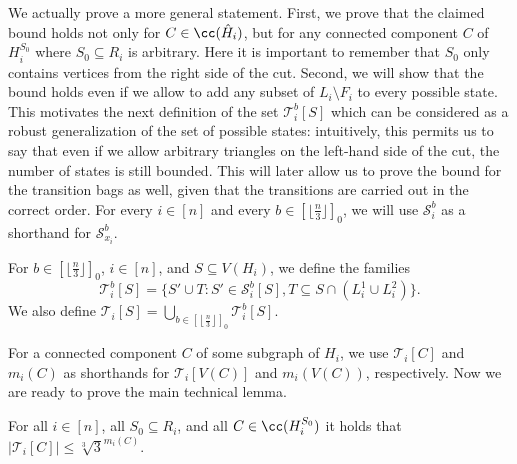 \documentclass[a4paper,UKenglish,cleveref, autoref, thm-restate]{lipics-v2021}
\begin{document}
We actually prove a more general statement. First, we prove that the claimed bound holds not only for $C\in\cc(\hat{H}_i)$, but for any connected component $C$ of $H_i^{S_0}$ where $S_0\subseteq R_i$ is arbitrary. 
Here it is important to remember that $S_0$ only contains vertices from the right side of the cut. 
Second, we will show that the bound holds even if we allow to add any subset of $L_i\setminus F_i$ to every possible state.
This motivates the next definition of the set $\mathcal{T}_i^b[S]$ which can be considered as a robust generalization of the set of possible states: intuitively, this permits us to say that even if we allow arbitrary triangles on the left-hand side of the cut, 
the number of states is still bounded.
This will later allow us to prove the bound for the transition bags as well, given that the transitions are carried out in the correct order.
For every $i \in [n]$ and every $b\in [\lfloor\frac{n}{3}\rfloor]_0$, we will use $\mathcal{S}_i^b$ as a shorthand for $\mathcal{S}_{x_i}^b$.

\begin{definition}
    For $b\in [\lfloor\frac{n}{3}\rfloor]_0$, $i\in[n]$, and $S\subseteq V(H_i)$, we define  the families 
    \[
    \mathcal{T}_i^b[S] = \{S'\cup T\colon S'\in\mathcal{S}_i^b[S], T \subseteq S\cap (L^1_i\cup L^2_i)\}.
    \]
    We also define 
    $\mathcal{T}_i[S] =\bigcup\limits_{b\in\left[\left\lfloor\frac{n}{3}\right\rfloor\right]_0} \mathcal{T}_i^b[S]$.
\end{definition}

For a connected component $C$ of some subgraph of $H_i$, we use $\mathcal{T}_i[C]$ and $m_i(C)$ as shorthands for $\mathcal{T}_i[V(C)]$ and $m_i(V(C))$, respectively.
Now we are ready to prove the main technical lemma. 

\begin{lemma}\label{lem:states-bound-after-set-remove}
    For all $i\in[n]$, all $S_0 \subseteq R_i$, and all $C\in \cc(H_i^{S_0})$ it holds that 
    $|\mathcal{T}_i[C]| \leq \sqrt[3]{3}^{m_i(C)}$.
\end{lemma} 
\end{document}
